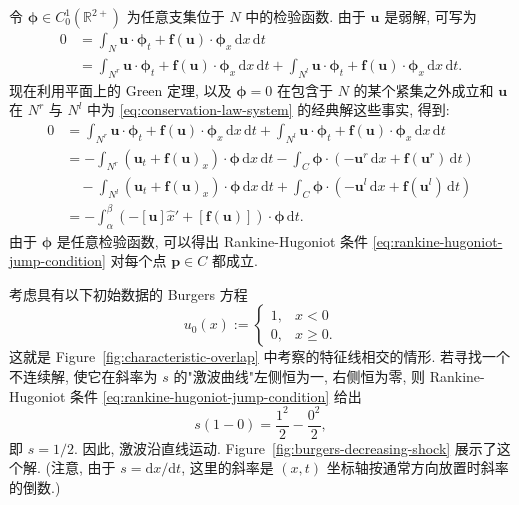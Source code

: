 \begin{Proof}
令 $\bm{\phi}\in C_0^1(\mathbb{R}^{2+})$ 为任意支集位于 $N$ 中的检验函数. 由于 $\bm{u}$ 是弱解, 可写为
\[
\begin{aligned}
0&=\int_N\bm{u}\cdot\bm{\phi}_t+\bm{f}(\bm{u})\cdot\bm{\phi}_x\,\mathrm{d}x\,\mathrm{d}t\\
&=\int_{N^r}\bm{u}\cdot\bm{\phi}_t+\bm{f}(\bm{u})\cdot\bm{\phi}_x\,\mathrm{d}x\,\mathrm{d}t
+\int_{N^l}\bm{u}\cdot\bm{\phi}_t+\bm{f}(\bm{u})\cdot\bm{\phi}_x\,\mathrm{d}x\,\mathrm{d}t.
\end{aligned}
\]
现在利用平面上的 Green 定理, 以及 $\bm{\phi}=0$ 在包含于 $N$ 的某个紧集之外成立和 $\bm{u}$ 在 $N^r$ 与 $N^l$ 中为 \eqref{eq:conservation-law-system} 的经典解这些事实, 得到:
\[
\begin{aligned}
0&=\int_{N^r}\bm{u}\cdot\bm{\phi}_t+\bm{f}(\bm{u})\cdot\bm{\phi}_x\,\mathrm{d}x\,\mathrm{d}t
+\int_{N^l}\bm{u}\cdot\bm{\phi}_t+\bm{f}(\bm{u})\cdot\bm{\phi}_x\,\mathrm{d}x\,\mathrm{d}t\\
&=-\int_{N^r}(\bm{u}_t+\bm{f}(\bm{u})_x)\cdot\bm{\phi}\,\mathrm{d}x\,\mathrm{d}t
-\int_C\bm{\phi}\cdot(-\bm{u}^r\,\mathrm{d}x+\bm{f}(\bm{u}^r)\,\mathrm{d}t)\\
&\quad-\int_{N^l}(\bm{u}_t+\bm{f}(\bm{u})_x)\cdot\bm{\phi}\,\mathrm{d}x\,\mathrm{d}t
+\int_C\bm{\phi}\cdot(-\bm{u}^l\,\mathrm{d}x+\bm{f}(\bm{u}^l)\,\mathrm{d}t)\\
&=-\int_\alpha^\beta(-[\bm{u}]\hat x'+[\bm{f}(\bm{u})])\cdot\bm{\phi}\,\mathrm{d}t.
\end{aligned}
\]
由于 $\bm{\phi}$ 是任意检验函数, 可以得出 Rankine-Hugoniot 条件 \eqref{eq:rankine-hugoniot-jump-condition} 对每个点 $\bm{p}\in C$ 都成立.
\end{Proof}

\begin{Example}
\label{ex:burgers-decreasing-shock}
考虑具有以下初始数据的 Burgers 方程
\begin{equation}\label{eq:burgers-decreasing-step-data}
u_0(x):=\begin{cases}1,&x<0\\0,&x\geq0.\end{cases}
\end{equation}
这就是 Figure~\ref{fig:characteristic-overlap} 中考察的特征线相交的情形. 若寻找一个不连续解, 使它在斜率为 $s$ 的"激波曲线"左侧恒为一, 右侧恒为零, 则 Rankine-Hugoniot 条件 \eqref{eq:rankine-hugoniot-jump-condition} 给出
\begin{equation}\label{eq:burgers-decreasing-step-shock-speed}
s(1-0)=\dfrac{1^2}{2}-\dfrac{0^2}{2},
\end{equation}
即 $s=1/2$. 因此, 激波沿直线运动. Figure~\ref{fig:burgers-decreasing-shock} 展示了这个解. (注意, 由于 $s=\mathrm{d}x/\mathrm{d}t$, 这里的斜率是 $(x,t)$ 坐标轴按通常方向放置时斜率的倒数.)
\end{Example}

